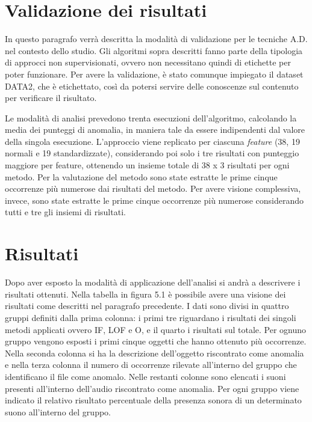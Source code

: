 \section{Validazione dei risultati}
In questo paragrafo verrà descritta la modalità di validazione per le tecniche A.D. nel
contesto dello studio. Gli algoritmi sopra descritti fanno parte della tipologia di approcci non
supervisionati, ovvero non necessitano quindi di etichette per poter funzionare. Per avere la
validazione, è stato comunque impiegato il dataset DATA2, che è etichettato, così da potersi
servire delle conoscenze sul contenuto per verificare il risultato.

Le modalità di analisi prevedono trenta esecuzioni dell’algoritmo, calcolando la media dei
punteggi di anomalia, in maniera tale da essere indipendenti dal valore della singola
esecuzione. L’approccio viene replicato per ciascuna \textit{feature} (38, 19 normali e 19
standardizzate), considerando poi solo i tre risultati con punteggio maggiore per feature,
ottenendo un insieme totale di 38 x 3 risultati per ogni metodo. Per la valutazione del metodo
sono state estratte le prime cinque occorrenze più numerose dai risultati del metodo. Per avere visione complessiva,
invece, sono state estratte le prime cinque occorrenze più numerose considerando tutti e tre
gli insiemi di risultati.

\section{Risultati}
Dopo aver esposto la modalità di applicazione dell’analisi si andrà a descrivere i risultati
ottenuti. Nella tabella in figura 5.1 è possibile avere una visione dei risultati come descritti nel
paragrafo precedente. I dati sono divisi in quattro gruppi definiti dalla prima colonna: i primi
tre riguardano i risultati dei singoli metodi applicati ovvero IF, LOF e O, e il quarto i risultati
sul totale. Per ognuno gruppo vengono esposti i primi cinque oggetti che hanno ottenuto più
occorrenze. Nella seconda colonna si ha la descrizione dell’oggetto riscontrato come
anomalia e nella terza colonna il numero di occorrenze rilevate all'interno del gruppo che identificano il file come anomalo. Nelle restanti colonne sono elencati i suoni presenti all’interno dell’audio riscontrato come
anomalia. Per ogni gruppo viene indicato il relativo risultato percentuale della presenza sonora di un determinato suono all'interno del gruppo.


